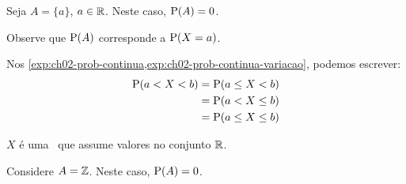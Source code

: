 \begin{example}
    Seja $A = \{a\}$, $a \in \operatorname{\mathbb{R}}$. Neste caso, $\operatorname{P}(A) = 0$.

    Observe que $\operatorname{P}(A)$ corresponde a $\operatorname{P}(X = a)$.
    
    Nos \cref{exp:ch02-prob-continua,exp:ch02-prob-continua-variacao}, podemos escrever:
    \begin{align*}
        \operatorname{P}(a < X < b)
        &= \operatorname{P}(a \leq X < b) \\
        &= \operatorname{P}(a < X \leq b) \\
        &= \operatorname{P}(a \leq X \leq b)
    \end{align*}
\end{example}

\begin{example}
    $X$ é uma \va\ que assume valores no conjunto $\operatorname{\mathbb{R}}$.

    Considere $A = \operatorname{\mathbb{Z}}$. Neste caso, $\operatorname{P}(A) = 0$.
\end{example}

